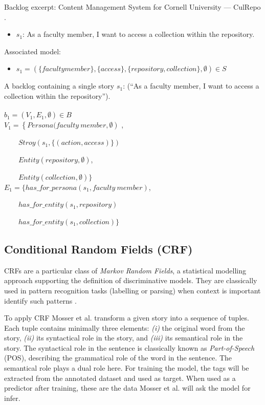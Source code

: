 \begin{example}\label{ex_2}
Backlog excerpt: Content Management System for Cornell University — CulRepo \emph{\cite{Dalpiaz2018}}.
\begin{itemize}
\item $s_1$: As a faculty member, I want to access a collection within the repository.
\end{itemize}
Associated model:
\begin{itemize}
\item $s_1 = (\{ faculty member \} ,\{ access\} ,\{ repository, collection\} ,\emptyset)\in S$
\end{itemize}
A backlog containing a single story $s_1$: (\enquote{As a faculty member, I want to access a collection within the repository}). \\ \\ 
$b_1=\left(V_1 , E_1,\emptyset \right ) \in B$ \\ 
$V_1=\left \{ Persona(faculty \ member, \emptyset \right )$ ,

\ \ \ \ $Stroy \left (s_1, \{ \left (action, access \right ) \} \right )$

\ \ \ \ $Entity \left (repository, \emptyset \right ) $,

\ \ \ \ $Entity(collection, \emptyset ) \} $ \\ 
$E_1 = \{ has\_for\_persona(s_1,faculty \ member)$,

\ \ \ \ $has\_for\_entity \left (s_1,repository \right )$

\ \ \ \ $has\_for\_entity(s_1, collection)\}$
\end{example}
\subsection*{Conditional Random Fields (CRF)}
CRFs \cite{Lafferty2001} are a particular class of \emph{Markov Random Fields}, a statistical modelling approach supporting the definition of discriminative models. They are classically used in pattern recognition tasks (labelling or parsing) when context is important identify such patterns \cite{arulmohan2023extracting}.

To apply CRF Mosser et al. transform a given story into a sequence of tuples. Each tuple contains minimally three elements: \emph{(i)} the original word from the story, \emph{(ii)} its syntactical role in the story, and \emph{(iii)} its semantical role in the story. The syntactical role in the sentence is classically known as \emph{Part-of-Speech} (POS), describing the grammatical role of the word in the sentence. The semantical role plays a dual role here. For training the model, the tags will be extracted from the annotated dataset and used as target. When used as a predictor after training, these are the data Mosser et al. will ask the model for infer.


